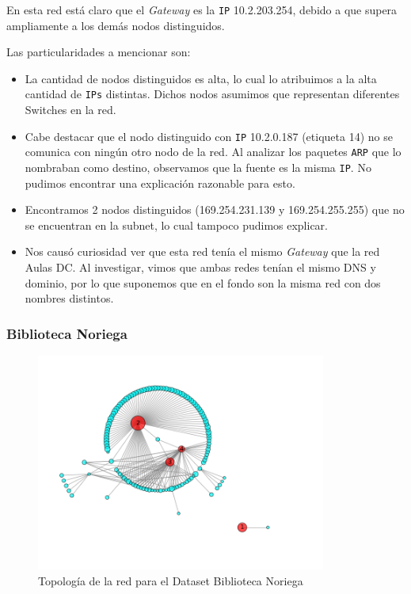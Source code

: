 En esta red está claro que el \textit{Gateway} es la \texttt{IP} 10.2.203.254, debido a que
supera ampliamente a los demás nodos distinguidos.

Las particularidades a mencionar son:
\begin{itemize}
    \item La cantidad de nodos distinguidos es alta, lo cual lo atribuimos a la alta
        cantidad de \texttt{IPs} distintas.
        Dichos nodos asumimos que representan diferentes Switches en la red.
    \item Cabe destacar que el nodo distinguido con \texttt{IP} 10.2.0.187 (etiqueta 14)
        no se comunica con ningún otro nodo de la red. Al analizar los paquetes \texttt{ARP} que lo nombraban como
        destino, observamos que la fuente es la misma \texttt{IP}. No pudimos encontrar una explicación razonable para
        esto.
    \item Encontramos 2 nodos distinguidos (169.254.231.139 y 169.254.255.255) que no
        se encuentran en la subnet, lo cual tampoco pudimos explicar.
    \item Nos causó curiosidad ver que esta red tenía el mismo \textit{Gateway} que la red
        Aulas DC. Al investigar, vimos que ambas redes tenían el mismo DNS y dominio, por lo que suponemos
        que en el fondo son la misma red con dos nombres distintos.
\end{itemize}

\subsubsection{Biblioteca Noriega}

\begin{figure}[H]
    \centering
    \includegraphics[width=0.85\textwidth]{imagenes/noriega.png}
    \caption{Topología de la red para el Dataset Biblioteca Noriega}
\end{figure}

